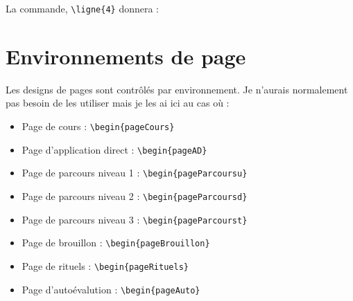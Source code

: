 \begin{pageCours}
\begin{Ex}
La commande, \verb|\ligne{4}| donnera :
\end{Ex}

\section{Environnements de page}

Les designs de pages sont contrôlés par environnement. Je n'aurais normalement pas besoin de les utiliser mais je les ai ici au cas où :

\begin{itemize}
\item Page de cours : \verb|\begin{pageCours}|
\item Page d'application direct : \verb|\begin{pageAD}|
\item Page de parcours niveau 1 : \verb|\begin{pageParcoursu}|
\item Page de parcours niveau 2 : \verb|\begin{pageParcoursd}|
\item Page de parcours niveau 3 : \verb|\begin{pageParcourst}|
\item Page de brouillon : \verb|\begin{pageBrouillon}|
\item Page de rituels : \verb|\begin{pageRituels}|
\item Page d'autoévalution : \verb|\begin{pageAuto}|
\end{itemize}

\end{pageCours}


